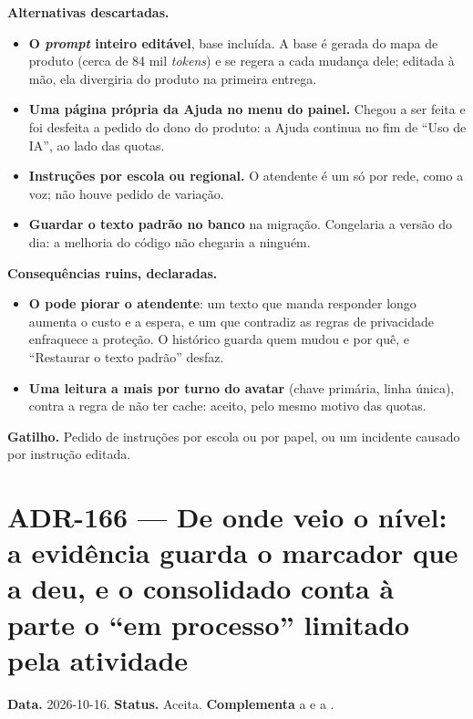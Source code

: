 \textbf{Alternativas descartadas.}

\begin{itemize}
  \item \textbf{O \emph{prompt} inteiro editável}, base incluída. A base é
    gerada do mapa de produto (cerca de 84 mil \emph{tokens}) e se regera a cada
    mudança dele; editada à mão, ela divergiria do produto na primeira entrega.
  \item \textbf{Uma página própria da Ajuda no menu do painel.} Chegou a ser
    feita e foi desfeita a pedido do dono do produto: a Ajuda continua no fim
    de \enquote{Uso de IA}, ao lado das quotas.
  \item \textbf{Instruções por escola ou regional.} O atendente é um só por
    rede, como a voz; não houve pedido de variação.
  \item \textbf{Guardar o texto padrão no banco} na migração. Congelaria a
    versão do dia: a melhoria do código não chegaria a ninguém.
\end{itemize}

\textbf{Consequências ruins, declaradas.}

\begin{itemize}
  \item \textbf{O  pode piorar o atendente}: um texto que manda
    responder longo aumenta o custo e a espera, e um que contradiz as regras de
    privacidade enfraquece a proteção. O histórico guarda quem mudou e por quê,
    e \enquote{Restaurar o texto padrão} desfaz.
  \item \textbf{Uma leitura a mais por turno do avatar} (chave primária, linha
    única), contra a regra de não ter cache: aceito, pelo mesmo motivo das
    quotas.
\end{itemize}

\textbf{Gatilho.} Pedido de instruções por escola ou por papel, ou um incidente
causado por instrução editada.

\section{ADR-166 --- De onde veio o nível: a evidência guarda o marcador que a deu, e o consolidado conta à parte o \enquote{em processo} limitado pela atividade}
\label{adr:evidencia-origem-do-nivel}

\textbf{Data.} 2026-10-16. \textbf{Status.} Aceita. \textbf{Complementa} a
 e a .

